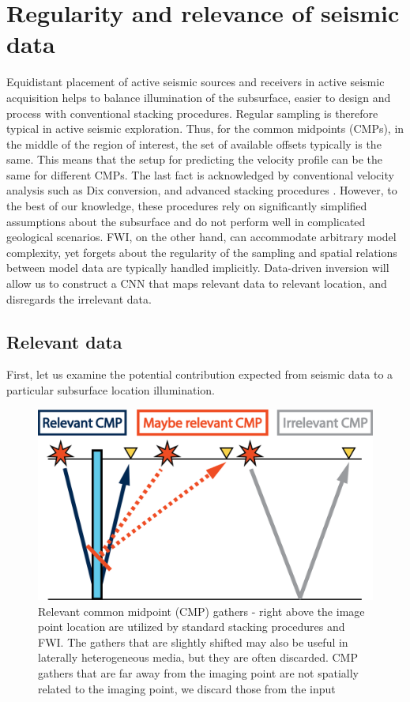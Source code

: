 \documentclass[manuscript]{geophysics}
\begin{document}
\section{Regularity and relevance of seismic data}
Equidistant placement of active seismic sources and receivers in active seismic acquisition helps to balance illumination of the subsurface, easier to design and process with conventional stacking procedures. Regular sampling is therefore typical in active seismic exploration. Thus, for the common midpoints (CMPs), in the middle of the region of interest, the set of available offsets typically is the same.
This means that the setup for predicting the velocity profile can be the same for different CMPs.
The last fact is acknowledged by conventional velocity analysis such as Dix conversion, and advanced stacking procedures \citep{mann1999common}. However, to the best of our knowledge, these procedures rely on significantly simplified assumptions about the subsurface and do not perform well in complicated geological scenarios.
FWI, on the other hand, can accommodate arbitrary model complexity, yet forgets about the regularity of the sampling and spatial relations between model data are typically handled implicitly. Data-driven inversion will allow us to construct a CNN that maps relevant data to relevant location, and disregards the irrelevant data.  

\subsection{Relevant data}

First, let us examine the potential contribution expected from seismic data to a particular subsurface location illumination.

\begin{figure}[h!]
	\centering
	\includegraphics[width=0.7\linewidth]{Fig/relevantCMP}
	\caption{Relevant common midpoint (CMP) gathers - right above the image point location are utilized by standard stacking procedures and FWI. The gathers that are slightly shifted may also be useful in laterally heterogeneous media, but they are often discarded. CMP gathers that are far away from the imaging point are not spatially related to the imaging point, we discard those from the input}
	\label{fig:relevantCMP}
\end{figure}
\end{document}
